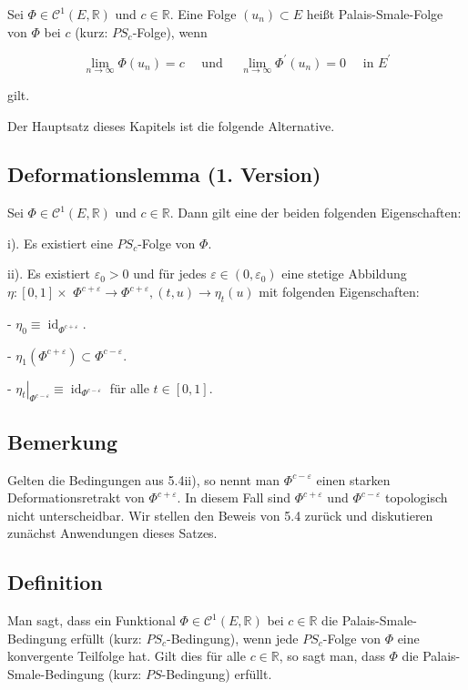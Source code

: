 \documentclass[10pt, letterpaper]{article}
\begin{document}
Sei $\Phi \in \mathcal{C}^{1}(E, \mathbb{R})$ und $c \in \mathbb{R}$. Eine Folge $\left(u_{n}\right) \subset E$ heißt Palais-Smale-Folge von $\Phi$ bei $c$ (kurz: $P S_{c}$-Folge), wenn

$$
\lim _{n \rightarrow \infty} \Phi\left(u_{n}\right)=c \quad \text { und } \quad \lim _{n \rightarrow \infty} \Phi^{\prime}\left(u_{n}\right)=0 \quad \text { in } E^{\prime}
$$

gilt.

Der Hauptsatz dieses Kapitels ist die folgende Alternative.

\subsection*{Deformationslemma (1. Version)}

Sei $\Phi \in \mathcal{C}^{1}(E, \mathbb{R})$ und $c \in \mathbb{R}$. Dann gilt eine der beiden folgenden Eigenschaften:

i). Es existiert eine $P S_{c}$-Folge von $\Phi$.

ii). Es existiert $\varepsilon_{0}>0$ und für jedes $\varepsilon \in\left(0, \varepsilon_{0}\right)$ eine stetige Abbildung $\eta:[0,1] \times$ $\Phi^{c+\varepsilon} \rightarrow \Phi^{c+\varepsilon},(t, u) \rightarrow \eta_{t}(u)$ mit folgenden Eigenschaften:

- $\eta_{0} \equiv \operatorname{id}_{\Phi^{c+\varepsilon}}$.

- $\eta_{1}\left(\Phi^{c+\varepsilon}\right) \subset \Phi^{c-\varepsilon}$.

- $\left.\eta_{t}\right|_{\Phi^{c-\varepsilon}} \equiv \operatorname{id}_{\Phi^{c-\varepsilon}}$ für alle $t \in[0,1]$.

\subsection*{Bemerkung}

Gelten die Bedingungen aus 5.4ii), so nennt man $\Phi^{c-\varepsilon}$ einen starken Deformationsretrakt von $\Phi^{c+\varepsilon}$. In diesem Fall sind $\Phi^{c+\varepsilon}$ und $\Phi^{c-\varepsilon}$ topologisch nicht unterscheidbar. Wir stellen den Beweis von 5.4 zurück und diskutieren zunächst Anwendungen dieses Satzes.

\subsection*{Definition}

Man sagt, dass ein Funktional $\Phi \in \mathcal{C}^{1}(E, \mathbb{R})$ bei $c \in \mathbb{R}$ die Palais-Smale-Bedingung erfüllt (kurz: $P S_{c}$-Bedingung), wenn jede $P S_{c}$-Folge von $\Phi$ eine konvergente Teilfolge hat. Gilt dies für alle $c \in \mathbb{R}$, so sagt man, dass $\Phi$ die Palais-Smale-Bedingung (kurz: $P S$-Bedingung) erfüllt.
\end{document}
